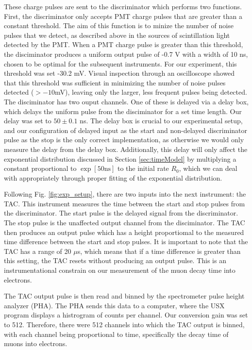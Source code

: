 \documentclass[
    aps, 
    twocolumn, 
    secnumarabic, 
    balancelastpage, 
    amsmath, 
    amssymb, 
    nofootinbib, 
    floatfix
]{revtex4-2}
\begin{document}
These charge pulses are sent to the discriminator which performs two functions. First, the discriminator only accepts PMT charge pulses that are greater than a constant threshold. The aim of this function is to minize the number of noise pulses that we detect, as described above in the sources of scintillation light detected by the PMT. When a PMT charge pulse is greater than this threshold, the disciminator produces a uniform output pulse of -0.7 V with a width of 10 ns, chosen to be optimal for the subsequent instruments. For our experiment, this threshold was set -30.2 mV. Visual inspection through an oscilloscope showed that this threshold was sufficient in minimizing the number of noise pulses detected ($>-10$mV), leaving only the larger, less frequent pulses being detected. The disciminator has two ouput channels. One of these is delayed via a delay box, which delays the uniform pulse from the disciminator for a set time length. Our delay was set to $50 \pm 0.1$ ns. The delay box is crucial to our experimental setup, and our configuration of delayed input as the start and non-delayed discriminator pulse as the stop is the only correct implementation, as otherwise we would only measure the delay from the delay box. Additionally, this delay will only affect the exponential distribution discussed in Section \ref{sec:timeModel} by multiplying a constant proportional to $\exp[50\text{ns}]$ to the initial rate $R_0$, which we can deal with appropriately through proper fitting of the exponential distribution.

Following Fig. \ref{fig:exp_setup}, there are two inputs into the next instrument: the TAC. This instrument measures the time between the start and stop pulses from the discriminator. The start pulse is the delayed signal from the discriminator. The stop pulse is the unaffected output channel from the disciminator. The TAC then produces an output pulse which has a height proportiomal to the measured time difference between the start and stop pulses. It is important to note that the TAC has a range of 20 $\mu$s, which means that if a time difference is greater than this setting, the TAC resets without producing an output pulse. This is an instrumentational constrain on our measurement of the muon decay time into electrons. 

The TAC output pulse is then read and binned by the spectrometer pulse height analyzer (PHA). The PHA sends this data to a computer, where the USX program displays a histrogram of counts per channel. Our conversion gain was set to 512. Therefore, there were 512 channels into which the TAC output is binned, with each channel being proportional to time, specifically the decay time of muons into electrons. 
\end{document}
